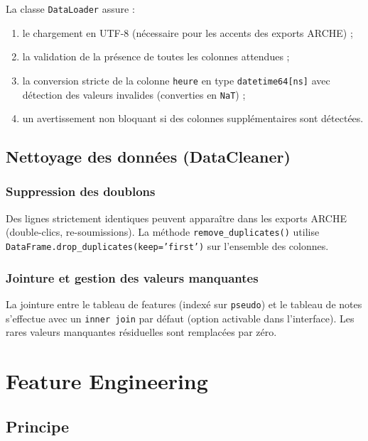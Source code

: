 \documentclass[12pt, a4paper, french]{report}
\begin{document}
\noindent La classe \texttt{DataLoader} assure :

\begin{enumerate}
  \item le chargement en UTF-8 (nécessaire pour les accents des exports ARCHE) ;
  \item la validation de la présence de toutes les colonnes attendues ;
  \item la conversion stricte de la colonne \texttt{heure} en type \texttt{datetime64[ns]} avec détection des valeurs invalides (converties en \texttt{NaT}) ;
  \item un avertissement non bloquant si des colonnes supplémentaires sont détectées.
\end{enumerate}

\section{Nettoyage des données (DataCleaner)}

\subsection{Suppression des doublons}

Des lignes strictement identiques peuvent apparaître dans les exports ARCHE (double-clics, re-soumissions). La méthode \texttt{remove\_duplicates()} utilise \texttt{DataFrame.drop\_duplicates(keep='first')} sur l'ensemble des colonnes.

\subsection{Jointure et gestion des valeurs manquantes}

La jointure entre le tableau de features (indexé sur \texttt{pseudo}) et le tableau de notes s'effectue avec un \texttt{inner join} par défaut (option activable dans l'interface).
Les rares valeurs manquantes résiduelles sont remplacées par zéro.

\chapter{Feature Engineering}

\section{Principe}
\end{document}
